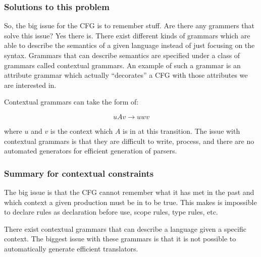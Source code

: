 \subsubsection{Solutions to this problem}
So, the big issue for the CFG is to remember stuff. Are there any grammers that
solve this issue? Yes there is. There exist different kinds of grammars which
are able to describe the semantics of a given language instead of just focusing
on the syntax. Grammars that can describe semantics are specified under a class
of grammars called contextual grammars.
\cite{plpp}
An example of such a grammar is an attribute grammar which actually
``decorates'' a CFG with those attributes we are interested in.
\cite{attrgrammar}

Contextual grammars can take the form of:

\[
  uAv \rightarrow uwv
\]

where $u$ and $v$ is the context which $A$ is in at this transition. The issue
with contextual grammars is that they are difficult to write, process, and there 
are no automated generators for efficient generation of parsers.
\cite{attrgrammar}

\subsubsection{Summary for contextual constraints}
The big issue is that the CFG cannot remember what it has met in the past and
which context a given production must be in to be true. This makes is impossible
to declare rules as declaration before use, scope rules, type rules, etc.

There exist contextual grammars that can describe a language given a specific
context. The biggest issue with these grammars is that it is not possible to
automatically generate efficient translators.

